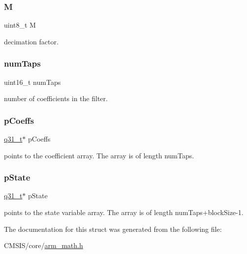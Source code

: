 \subsubsection{\texorpdfstring{M}{M}}
{\footnotesize\ttfamily uint8\+\_\+t M}

decimation factor. \mbox{\label{structarm__fir__decimate__instance__q31_a751941891e47f522a7f5375fe8990aac}} 
\subsubsection{\texorpdfstring{numTaps}{numTaps}}
{\footnotesize\ttfamily uint16\+\_\+t num\+Taps}

number of coefficients in the filter. \mbox{\label{structarm__fir__decimate__instance__q31_a68888e36167d81cb7836db10367a1682}} 
\subsubsection{\texorpdfstring{pCoeffs}{pCoeffs}}
{\footnotesize\ttfamily \mbox{\hyperlink{arm__math_8h_adc89a3547f5324b7b3b95adec3806bc0}{q31\+\_\+t}}$\ast$ p\+Coeffs}

points to the coefficient array. The array is of length num\+Taps. \mbox{\label{structarm__fir__decimate__instance__q31_adee4ba3ee8869865af7d8fa08ca913d6}} 
\subsubsection{\texorpdfstring{pState}{pState}}
{\footnotesize\ttfamily \mbox{\hyperlink{arm__math_8h_adc89a3547f5324b7b3b95adec3806bc0}{q31\+\_\+t}}$\ast$ p\+State}

points to the state variable array. The array is of length num\+Taps+block\+Size-\/1. 

The documentation for this struct was generated from the following file\+:\begin{DoxyCompactItemize}
\item 
C\+M\+S\+I\+S/core/\mbox{\hyperlink{arm__math_8h}{arm\+\_\+math.\+h}}\end{DoxyCompactItemize}
